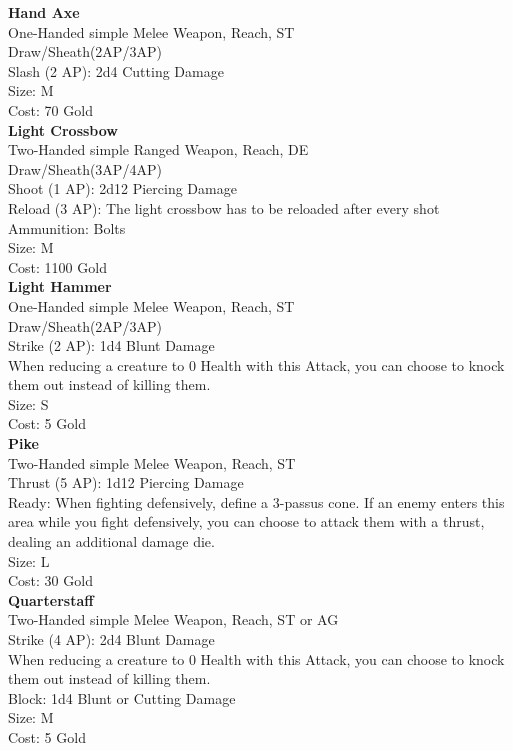 \textbf{Hand Axe}\label{weapon:handAxe}\\
One-Handed simple Melee Weapon,  Reach, ST\\
Draw/Sheath(2AP/3AP)\\
Slash (2 AP): 2d4 Cutting Damage\\
Size: M\\
Cost: 70 Gold\\

\textbf{Light Crossbow}\label{weapon:lightCrossbow}\\
Two-Handed simple Ranged Weapon,  Reach, DE\\
Draw/Sheath(3AP/4AP)\\
Shoot (1 AP): 2d12 Piercing Damage\\
Reload (3 AP): The light crossbow has to be reloaded after every shot\\
Ammunition: Bolts\\
Size: M\\
Cost: 1100 Gold\\

\textbf{Light Hammer}\label{weapon:lightHammer}\\
One-Handed simple Melee Weapon,  Reach, ST\\
Draw/Sheath(2AP/3AP)\\
Strike (2 AP): 1d4 Blunt Damage\\
When reducing a creature to 0 Health with this Attack, you can choose to knock them out instead of killing them.\\
Size: S\\
Cost: 5 Gold\\

\textbf{Pike}\label{weapon:pike}\\
Two-Handed simple Melee Weapon,  Reach, ST\\
Thrust (5 AP): 1d12 Piercing Damage\\
Ready: When fighting defensively, define a 3-passus cone.
If an enemy enters this area while you fight defensively, you can choose to attack them with a thrust, dealing an additional damage die.\\
Size: L\\
Cost: 30 Gold\\

\textbf{Quarterstaff}\label{weapon:quarterstaff}\\
Two-Handed simple Melee Weapon,  Reach, ST or AG\\
Strike (4 AP): 2d4 Blunt Damage\\
When reducing a creature to 0 Health with this Attack, you can choose to knock them out instead of killing them.\\
Block: 1d4 Blunt or Cutting Damage\\
Size: M\\
Cost: 5 Gold\\

